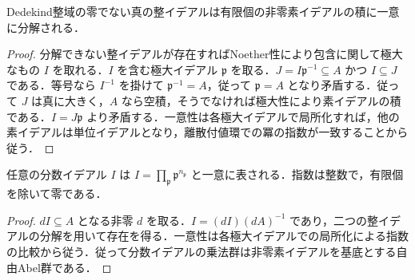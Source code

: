 \begin{prop}[整イデアルの素イデアル分解]
Dedekind整域の零でない真の整イデアルは有限個の非零素イデアルの積に一意に分解される．
\end{prop}
\begin{proof}
分解できない整イデアルが存在すればNoether性により包含に関して極大なもの $I$ を取れる．$I$ を含む極大イデアル $\mathfrak p$ を取る．$J=I\mathfrak p^{-1}\subseteq A$ かつ $I\subseteq J$ である．等号なら $I^{-1}$ を掛けて $\mathfrak p^{-1}=A$，従って $\mathfrak p=A$ となり矛盾する．従って $J$ は真に大きく，$A$ なら空積，そうでなければ極大性により素イデアルの積である．$I=J\mathfrak p$ より矛盾する．一意性は各極大イデアルで局所化すれば，他の素イデアルは単位イデアルとなり，離散付値環での冪の指数が一致することから従う．
\end{proof}
\begin{prop}[分数イデアルの一意分解]
任意の分数イデアル $I$ は $I=\prod_{\mathfrak p}\mathfrak p^{n_{\mathfrak p}}$ と一意に表される．指数は整数で，有限個を除いて零である．
\end{prop}
\begin{proof}
$dI\subseteq A$ となる非零 $d$ を取る．$I=(dI)(dA)^{-1}$ であり，二つの整イデアルの分解を用いて存在を得る．一意性は各極大イデアルでの局所化による指数の比較から従う．従って分数イデアルの乗法群は非零素イデアルを基底とする自由Abel群である．
\end{proof}
